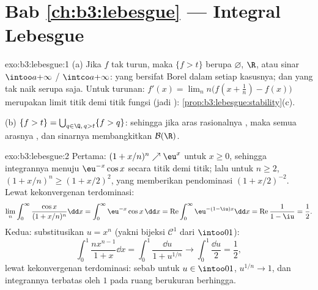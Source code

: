 \section*{Bab \ref{ch:b3:lebesgue} --- Integral
Lebesgue}

\begin{solution}{exo:b3:lebesgue:1}
(a) Jika $f$ tak turun, maka $\{f > t\}$ berupa $\varnothing$, $\R$,
atau sinar $\intoo a{+\infty}$ / $\intco a{+\infty}$: yang bersifat Borel dalam
setiap kasusnya; dan yang tak naik serupa saja. Untuk turunan: $f'(x) =
\lim_n n\bigl(f(x + \frac1n) - f(x)\bigr)$ merupakan limit titik demi titik
fungsi  (jadi ):
\cref{prop:b3:lebesgue:stability}(c).

(b) $\{f > t\} = \bigcup_{q \in \Q,\, q > t}\{f > q\}$: sehingga jika
aras rasionalnya , maka semua arasnya , dan sinarnya
membangkitkan $\mathcal B(\R)$.
\end{solution}

\begin{solution}{exo:b3:lebesgue:2}
Pertama: $(1 + x/n)^n \nearrow \eu^x$ untuk $x \geq 0$, sehingga
integrannya menuju $\eu^{-x}\cos x$ secara titik demi titik; lalu untuk $n \geq 2$,
$(1 + x/n)^n \geq (1 + x/2)^2$, yang memberikan pendominasi 
$(1 + x/2)^{-2}$. Lewat kekonvergenan terdominasi:
\[
\lim_n\int_0^\infty\frac{\cos x}{(1 + x/n)^n}\dd x
= \int_0^\infty \eu^{-x}\cos x\,\dd x
= \operatorname{Re}\int_0^\infty\eu^{-(1 - \iu)x}\dd x
= \operatorname{Re}\frac{1}{1 - \iu} = \frac12 .
\]
Kedua: substitusikan $u = x^n$ (yakni bijeksi $\mathcal C^1$ dari
$\intoo01$):
\[
\int_0^1\frac{nx^{n-1}}{1 + x}\dd x = \int_0^1\frac{\dd u}{1 +
u^{1/n}} \longrightarrow \int_0^1\frac{\dd u}{2} = \frac12,
\]
lewat kekonvergenan terdominasi: sebab untuk $u \in \intoo01$, $u^{1/n} \to 1$, dan
integrannya terbatas oleh $1$ pada ruang berukuran berhingga.
\end{solution}

